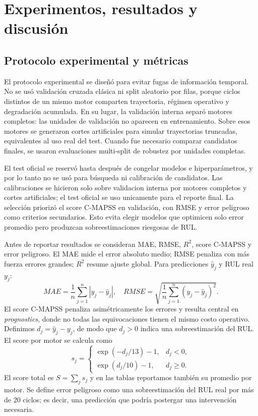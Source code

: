 \documentclass[conference, a4paper]{IEEEtran}
\begin{document}
\section{Experimentos, resultados y discusión}
\subsection{Protocolo experimental y métricas}
El protocolo experimental se diseñó para evitar fugas de información temporal. No se usó validación cruzada clásica ni split aleatorio por filas, porque ciclos distintos de un mismo motor comparten trayectoria, régimen operativo y degradación acumulada. En su lugar, la validación interna separó motores completos: las unidades de validación no aparecen en entrenamiento. Sobre esos motores se generaron cortes artificiales para simular trayectorias truncadas, equivalentes al uso real del test. Cuando fue necesario comparar candidatos finales, se usaron evaluaciones multi-split de robustez por unidades completas.

El test oficial se reservó hasta después de congelar modelos e hiperparámetros, y por lo tanto no se usó para búsqueda ni calibración de candidatos. Las calibraciones se hicieron solo sobre validacion interna por motores completos y cortes artificiales; el test oficial se uso unicamente para el reporte final. La selección priorizó el score C-MAPSS en validación, con RMSE y error peligroso como criterios secundarios. Esto evita elegir modelos que optimicen solo error promedio pero produzcan sobreestimaciones riesgosas de RUL.

Antes de reportar resultados se consideran MAE, RMSE, $R^2$, score C-MAPSS y error peligroso. El MAE mide el error absoluto medio; RMSE penaliza con más fuerza errores grandes; $R^2$ resume ajuste global. Para predicciones $\hat{y}_j$ y RUL real $y_j$:
\begin{equation}
MAE=\frac{1}{n}\sum_{j=1}^{n}|y_j-\hat{y}_j|,\quad
RMSE=\sqrt{\frac{1}{n}\sum_{j=1}^{n}(y_j-\hat{y}_j)^2}.
\end{equation}
El score C-MAPSS penaliza asimétricamente los errores y resulta central en \textit{prognostics}, donde no todas las equivocaciones tienen el mismo costo operativo. Definimos $d_j=\hat{y}_j-y_j$, de modo que $d_j>0$ indica una sobreestimación del RUL. El score por motor se calcula como
\begin{equation}
s_j =
\begin{cases}
\exp(-d_j/13)-1, & d_j < 0,\\
\exp(d_j/10)-1, & d_j \geq 0.
\end{cases}
\end{equation}
El score total es $S=\sum_j s_j$ y en las tablas reportamos también su promedio por motor. Se define error peligroso como una sobreestimación del RUL real por más de 20 ciclos; es decir, una predicción que podría postergar una intervención necesaria.
\end{document}
